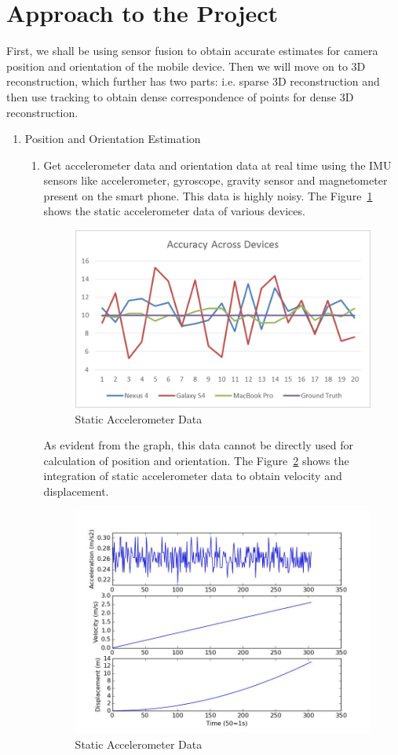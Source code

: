 \documentclass{article}
\begin{document}
	\section{Approach to the Project} 
		First, we shall be using sensor fusion to obtain accurate estimates for camera position and orientation of the mobile device. Then we will move on to 3D reconstruction, which further has two parts: i.e. sparse 3D reconstruction and then use tracking to obtain dense correspondence of points for dense 3D reconstruction.
		\begin{enumerate}
			\item Position and Orientation Estimation
			\begin{enumerate}
				\item
					Get accelerometer data and orientation data at real time using the IMU sensors like accelerometer, gyroscope, gravity sensor and magnetometer present on the smart phone.
					This data is highly noisy. The Figure~\ref{fig1} shows the static accelerometer data of various devices.

					\begin{figure}[ht!]
					\centering
					\includegraphics[width=10cm]{graph.jpg}
					\caption{Static Accelerometer Data\label{fig1}}
					\end{figure}

					As evident from the graph, this data cannot be directly used for calculation of position and orientation. 
					The Figure~\ref{fig2} shows the integration of static accelerometer data to obtain velocity and displacement.

					\begin{figure}[ht!]
					\centering
					\includegraphics[width=10cm]{integration.jpg}
					\caption{Static Accelerometer Data\label{fig2}}
					\end{figure}


\end{enumerate}
\end{enumerate}
\end{document}

